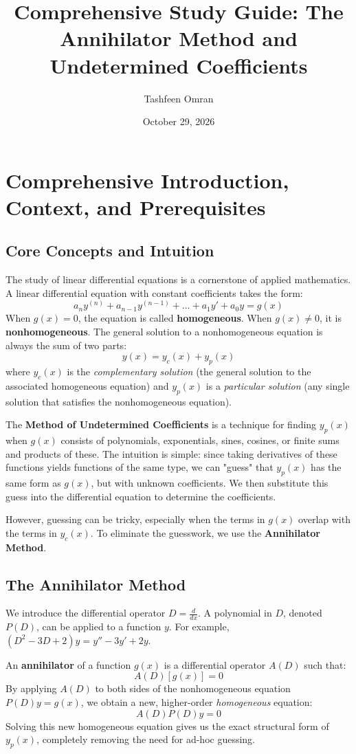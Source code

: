 \documentclass[11pt, a4paper]{article}
\title{\textbf{Comprehensive Study Guide: The Annihilator Method and Undetermined Coefficients}}
\author{Tashfeen Omran}
\date{October 29, 2026}
\theoremstyle{definition}
\theoremstyle{remark}
\begin{document}
\maketitle
\tableofcontents
\newpage

\section{Comprehensive Introduction, Context, and Prerequisites}

\subsection{Core Concepts and Intuition}
The study of linear differential equations is a cornerstone of applied mathematics. A linear differential equation with constant coefficients takes the form:
\[
a_n y^{(n)} + a_{n-1} y^{(n-1)} + \dots + a_1 y' + a_0 y = g(x)
\]
When $g(x) = 0$, the equation is called \textbf{homogeneous}. When $g(x) \neq 0$, it is \textbf{nonhomogeneous}. The general solution to a nonhomogeneous equation is always the sum of two parts:
\[
y(x) = y_c(x) + y_p(x)
\]
where $y_c(x)$ is the \textit{complementary solution} (the general solution to the associated homogeneous equation) and $y_p(x)$ is a \textit{particular solution} (any single solution that satisfies the nonhomogeneous equation).

The \textbf{Method of Undetermined Coefficients} is a technique for finding $y_p(x)$ when $g(x)$ consists of polynomials, exponentials, sines, cosines, or finite sums and products of these. The intuition is simple: since taking derivatives of these functions yields functions of the same type, we can "guess" that $y_p(x)$ has the same form as $g(x)$, but with unknown coefficients. We then substitute this guess into the differential equation to determine the coefficients.

However, guessing can be tricky, especially when the terms in $g(x)$ overlap with the terms in $y_c(x)$. To eliminate the guesswork, we use the \textbf{Annihilator Method}. 

\subsection{The Annihilator Method}
We introduce the differential operator $D = \frac{d}{dx}$. A polynomial in $D$, denoted $P(D)$, can be applied to a function $y$. For example, $(D^2 - 3D + 2)y = y'' - 3y' + 2y$.

An \textbf{annihilator} of a function $g(x)$ is a differential operator $A(D)$ such that:
\[
A(D)[g(x)] = 0
\]
By applying $A(D)$ to both sides of the nonhomogeneous equation $P(D)y = g(x)$, we obtain a new, higher-order \textit{homogeneous} equation:
\[
A(D)P(D)y = 0
\]
Solving this new homogeneous equation gives us the exact structural form of $y_p(x)$, completely removing the need for ad-hoc guessing.
\end{document}
